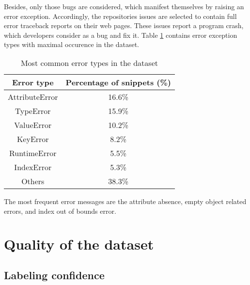 \documentclass[10pt,conference]{IEEEtran}
\begin{document}
Besides, only those bugs are considered, which manifest themselves by raising an error exception.
Accordingly, the repositories issues are selected to contain full error traceback reports
on their web pages. These issues report a program crash, which developers consider as a bug and fix it.
Table \ref{tab1} contains error exception types with maximal occurence in the dataset.

\begin{table}[htbp]
\caption{Most common error types in the dataset}
\begin{center}
\renewcommand{\arraystretch}{1.2}
\begin{tabular}{|c|c|}
\hline
  \textbf{Error type}  & \textbf{Percentage of snippets (\%)} \\
\hline
  AttributeError & 16.6\color{lightgray}\% \\
\hline
  TypeError & 15.9\color{lightgray}\% \\
\hline
  ValueError & 10.2\color{lightgray}\% \\
\hline
  KeyError & 8.2\color{lightgray}\% \\
\hline
  RuntimeError & 5.5\color{lightgray}\% \\
\hline
  IndexError &  5.3\color{lightgray}\% \\
\hline
  Others &  38.3\color{lightgray}\% \\
\hline
\end{tabular}
\label{tab1}
\end{center}
\end{table}

The most frequent error messages are the attribute absence, empty object related errors, and index out of bounds error.

\section{Quality of the dataset}\label{sec4}

\subsection{Labeling confidence}
\end{document}
